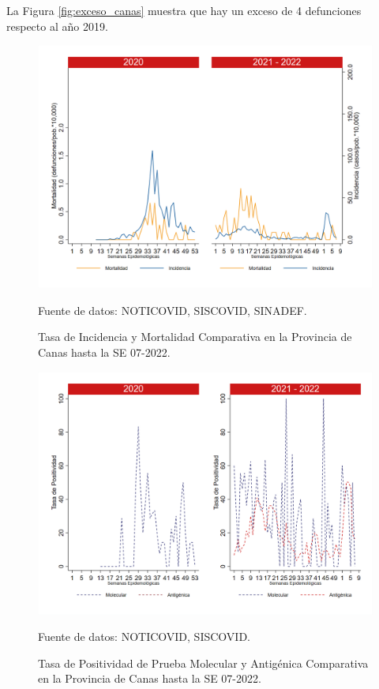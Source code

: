 \documentclass[12pt,a4paper,openany]{book}
\begin{document}
		La Figura \ref{fig:exceso_canas} muestra que hay un exceso de 4 defunciones respecto al año 2019.
		
		\begin{figure}[h]
			\caption{Tasa de Incidencia y Mortalidad Comparativa en la Provincia de Canas hasta la SE 07-2022.}\label{fig:inc_mort_canas}
			\begin{center}
				\includegraphics[width=0.7\linewidth]{../figuras/incidencia_mortalidad_20_21_3.png}
			\end{center}
			{\footnotesize {Fuente de datos: NOTICOVID, SISCOVID, SINADEF.}}
		\end{figure}
		
		\begin{figure}[h]
			\caption{Tasa de Positividad de Prueba Molecular y Antigénica Comparativa en la Provincia de Canas hasta la SE 07-2022.}\label{fig:positividad_canas}
			\begin{center}
				\includegraphics[width=0.7\linewidth]{../figuras/positividad_20_21_3.png}
			\end{center}
			{\footnotesize {Fuente de datos: NOTICOVID, SISCOVID.}}
		\end{figure}
		
\end{document}
